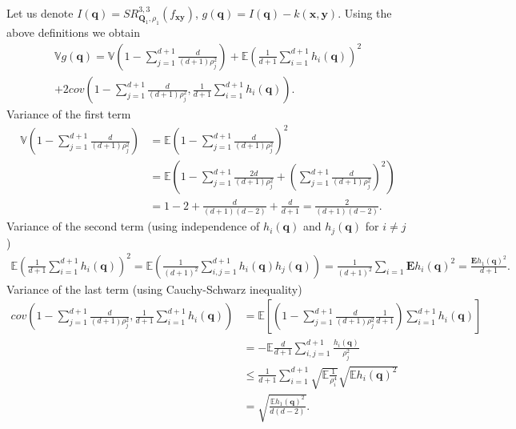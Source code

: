 Let us denote $I(\mathbf{q}) = SR^{3, 3}_{\mathbf{Q}_1,\rho_1}(f_{\mathbf{xy}})$,
$g(\mathbf{q}) = I(\mathbf{q}) - k(\mathbf{x}, \mathbf{y})$.
Using the above definitions we obtain
\begin{equation}
\begin{split}
\label{eq:variance_2_full}
\mathbb{V} g(\mathbf{q}) = \mathbb{V}\left ( 1 - \sum_{j = 1}^{d + 1}\frac{d}{(d + 1)\rho_j^2} \right) +
\mathbb{E} \left ( \frac{1}{d + 1} \sum_{i = 1}^{d + 1} h_i(\mathbf{q})\right)^2 \\
+ 2 cov \left ( 1 - \sum_{j = 1}^{d + 1}\frac{d}{(d + 1)\rho_j^2}, \frac{1}{d + 1} \sum_{i = 1}^{d + 1} h_i(\mathbf{q}) \right ).
\end{split}
\end{equation}
Variance of the first term
\begin{align}
\label{eq:variance_2_first_term}
\mathbb{V}\left (1 - \sum_{j = 1}^{d + 1}\frac{d}{(d + 1)\rho_j^2} \right ) &= \mathbb{E}\left (1 - \sum_{j = 1}^{d + 1}\frac{d}{(d + 1)\rho_j^2} \right )^2 \nonumber\\&=
\mathbb{E} \left ( 1 - \sum_{j = 1}^{d + 1}\frac{2d}{(d + 1)\rho_j^2} + \left ( \sum_{j = 1}^{d + 1}\frac{d}{(d + 1)\rho_j^2} \right )^2\right) \nonumber \\
&=1 - 2 + \frac{d}{(d + 1)(d - 2)} + \frac{d}{d + 1} = \frac{2}{(d + 1)(d - 2)}.
\end{align}
Variance of the second term (using independence of $h_i(\mathbf{q})$ and $h_j(\mathbf{q})$ for $i \ne j$)
\begin{align}
\label{eq:variance_2_second_term}
\mathbb{E}\left ( \frac{1}{d + 1} \sum_{i = 1}^{d + 1} h_i(\mathbf{q})\right)^2 =
\mathbb{E}\left ( \frac{1}{(d + 1)^2} \sum_{i, j = 1}^{d + 1} h_i(\mathbf{q}) h_j(\mathbf{q})\right) =
\frac{1}{(d + 1)^2} \sum_{i = 1} \mathbf{E} h_i(\mathbf{q})^2 = \frac{\mathbf{E}h_1(\mathbf{q})^2 }{d + 1}.
\end{align}
Variance of the last term (using Cauchy-Schwarz inequality)
\begin{align}
\label{eq:variance_2_third_term}
cov \left ( 1 - \sum_{j = 1}^{d + 1}\frac{d}{(d + 1)\rho_j^2}, \frac{1}{d + 1} \sum_{i = 1}^{d + 1} h_i(\mathbf{q})\right) & =
\mathbb{E}\left [ \left (1 - \sum_{j = 1}^{d + 1}\frac{d}{(d + 1)\rho_j^2} \frac{1}{d + 1} \right ) \sum_{i = 1}^{d + 1} h_i(\mathbf{q})\right] \nonumber \\
&= - \mathbb{E}\frac{d}{d + 1} \sum_{i, j = 1}^{d + 1} \frac{h_i (\mathbf{q})}{\rho_j^2} \nonumber \\ &\le
\frac{1}{d + 1} \sum_{i = 1}^{d + 1} \sqrt{\mathbb{E}\frac{1}{\rho_i^4}} \sqrt{\mathbb{E} h_i(\mathbf{q})^2} \nonumber \\ &=
\sqrt{ \frac{\mathbb{E}h_1(\mathbf{q})^2}{d(d - 2)}}.
\end{align}
